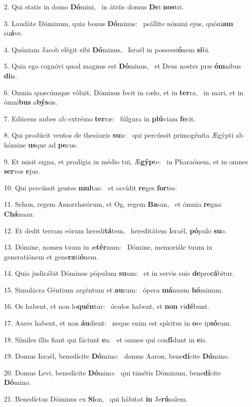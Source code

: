 2. Qui statis in domo \textbf{Dó}mini, \ast\  in átriis domus \textbf{De}i \textbf{nos}tri.\

3. Laudáte Dóminum, quia bonus \textbf{Dó}minus: \ast\  psállite nómini ejus, quóni\textbf{am} su\textbf{á}ve.\

4. Quóniam Jacob elégit sibi \textbf{Dó}minus, \ast\  Israël in possessi\textbf{ó}nem \textbf{si}bi.\

5. Quia ego cognóvi quod magnus est \textbf{Dó}minus, \ast\  et Deus noster præ \textbf{óm}nibus \textbf{di}is.\

6. Omnia quæcúmque vóluit, Dóminus fecit in cælo, et in \textbf{ter}ra, \ast\  in mari, et in ómni\textbf{bus} a\textbf{býs}sis.\

7. Edúcens nubes ab extrémo \textbf{ter}ræ: \ast\  fúlgura in \textbf{plú}viam \textbf{fe}cit.\

8. Qui prodúcit ventos de thesáuris \textbf{su}is: \ast\  qui percússit primogénita Ægýpti ab hómine \textbf{us}que ad \textbf{pe}cus.\

9. Et misit signa, et prodígia in médio tui, Æ\textbf{gýp}te: \ast\  in Pharaónem, et in omnes \textbf{ser}vos \textbf{e}jus.\

10. Qui percússit gentes \textbf{mul}tas: \ast\  et occídit \textbf{re}ges \textbf{for}tes:\

11. Sehon, regem Amorrhæórum, et Og, regem \textbf{Ba}san, \ast\  et ómnia \textbf{re}gna \textbf{Chá}naan.\

12. Et dedit terram eórum heredi\textbf{tá}tem, \ast\  hereditátem Israël, \textbf{pó}pulo \textbf{su}o.\

13. Dómine, nomen tuum in æ\textbf{tér}num: \ast\  Dómine, memoriále tuum in generatiónem et gene\textbf{ra}ti\textbf{ó}nem.\

14. Quia judicábit Dóminus pópulum \textbf{su}um: \ast\  et in servis suis \textbf{de}pre\textbf{cá}bitur.\

15. Simulácra Géntium argéntum et \textbf{au}rum: \ast\  ópera \textbf{má}nuum \textbf{hó}minum.\

16. Os habent, et non lo\textbf{quén}tur: \ast\  óculos habent, et \textbf{non} vi\textbf{dé}bunt.\

17. Aures habent, et non \textbf{áu}dient: \ast\  neque enim est spíritus in \textbf{o}re ip\textbf{só}rum.\

18. Símiles illis fiant qui fáciunt \textbf{e}a: \ast\  et omnes qui con\textbf{fí}dunt in \textbf{e}is.\

19. Domus Israël, benedícite \textbf{Dó}mino: \ast\  domus Aaron, bene\textbf{dí}cite \textbf{Dó}mino.\

20. Domus Levi, benedícite \textbf{Dó}mino: \ast\  qui timétis Dóminum, bene\textbf{dí}cite \textbf{Dó}mino.\

21. Benedíctus Dóminus ex \textbf{Si}on, \ast\  qui hábitat \textbf{in} Je\textbf{rú}salem.\

